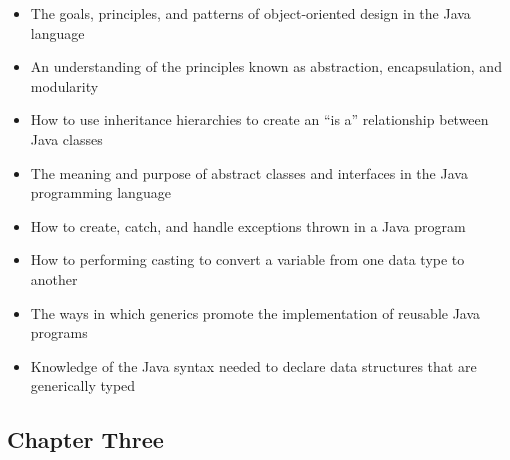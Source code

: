 \documentclass[11pt]{article}
\begin{document}
\begin{itemize}

  \setlength{\itemsep}{0.05in}

  \item The goals, principles, and patterns of object-oriented design in the
    Java language
  \item An understanding of the principles known as abstraction, encapsulation, and modularity
  \item How to use inheritance hierarchies to create an ``is a'' relationship
    between Java classes
  \item The meaning and purpose of abstract classes and interfaces in the Java
    programming language
  \item How to create, catch, and handle exceptions thrown in a Java program
  \item How to performing casting to convert a variable from one data type to another
  \item The ways in which generics promote the implementation of reusable Java
    programs
  \item Knowledge of the Java syntax needed to declare data structures
    that are generically typed

\end{itemize}

\vspace*{-.2in}
\subsection*{Chapter Three}
\end{document}
